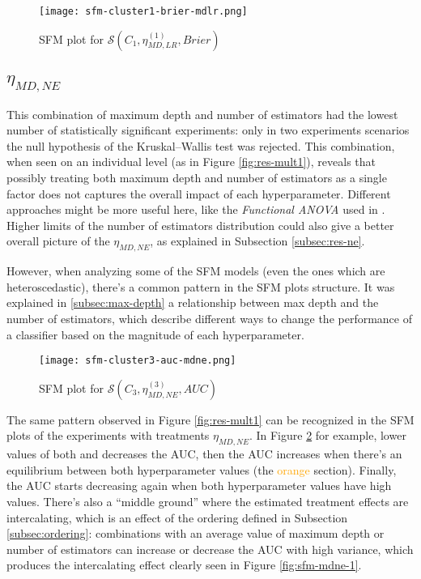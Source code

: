 \begin{figure}[H]
    \centering
    \texttt{[image: sfm-cluster1-brier-mdlr.png]}
    \caption{SFM plot for $\mathcal{S}(C_1, \eta^{(1)}_{MD, LR}, Brier)$}
    \label{fig:sfm-mdlr-2}
\end{figure}

\subsection{\texorpdfstring{\Large$\eta_{MD, NE}$}{}}

This combination of maximum depth and number of estimators had the lowest number of statistically significant experiments: only in two experiments scenarios the null hypothesis of the Kruskal–Wallis test was rejected. This combination, when seen on an individual level (as in Figure \ref{fig:res-mult1}), reveals that possibly treating both maximum depth and number of estimators as a single factor does not captures the overall impact of each hyperparameter. Different approaches might be more useful here, like the \textit{Functional ANOVA} used in \cite{van2018hyperparameter}. Higher limits of the number of estimators distribution could also give a better overall picture of the $\eta_{MD, NE}$, as explained in Subsection \ref{subsec:res-ne}.

However, when analyzing some of the SFM models (even the ones which are heteroscedastic), there's a common pattern in the SFM plots structure. It was explained in \ref{subsec:max-depth} a relationship between max depth and the number of estimators, which describe different ways to change the performance of a classifier based on the magnitude of each hyperparameter.

\begin{figure}[H]
    \centering
    \texttt{[image: sfm-cluster3-auc-mdne.png]}
    \caption{SFM plot for $\mathcal{S}(C_3, \eta^{(3)}_{MD, NE}, AUC)$}
    \label{fig:sfm-mdne-2}
\end{figure}

The same pattern observed in Figure \ref{fig:res-mult1} can be recognized in the SFM plots of the experiments with treatments $\eta_{MD, NE}$. In Figure \ref{fig:sfm-mdne-2} for example, lower values of both  and  decreases the AUC, then the AUC increases when there's an equilibrium between both hyperparameter values (the  \textcolor{orange}{orange} section). Finally, the AUC starts decreasing again when both hyperparameter values have high values. There's also a ``middle ground'' where the estimated treatment effects are intercalating, which is an effect of the ordering defined in Subsection \ref{subsec:ordering}: combinations with an average value of maximum depth or number of estimators can increase or decrease the AUC with high variance, which produces the intercalating effect clearly seen in Figure \ref{fig:sfm-mdne-1}.

